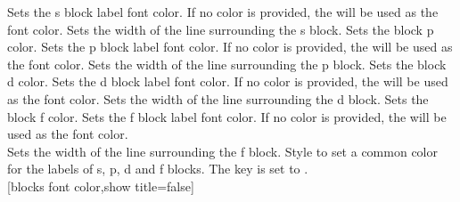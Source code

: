 \label{option_s block_font color}%
%
{Sets the s block label font color. If no color is provided, the  will be used as the font color.}%
\label{option_s block line width}%
%
{Sets the width of the line surrounding the s block.}%
\label{option_p block color}%
%
{Sets the block p color.}%
\label{option_p block_font color}%
%
{Sets the p block label font color. If no color is provided, the  will be used as the font color.}%
\label{option_p block line width}%
%
{Sets the width of the line surrounding the p block.}%
\label{option_d block color}%
%
{Sets the block d color.}%
\label{option_d block_font color}%
%
{Sets the d block label font color. If no color is provided, the  will be used as the font color.}%
\label{option_d block line width}%
%
{Sets the width of the line surrounding the d block.}%
\label{option_f block color}%
%
{Sets the block f color.}%
\label{option_f block_font color}%
%
{Sets the f block label font color. If no color is provided, the  will be used as the font color.}%
\newpage\ \\ [-32pt]%
\label{option_f block line width}%
%
{Sets the width of the line surrounding the f block.}%
\label{style_blocks font color}%
%
{Style to set a common color for the labels of s, p, d and f blocks. The key  is set to .
}%
\\ [5pt][blocks font color,show title=false]%
\\ [5pt]\makebox[\linewidth][c]{\scalebox{.6}{\pgfPT[blocks font color,show title=false]}}%
\\ [-5pt]\pgfPTendstyle%
